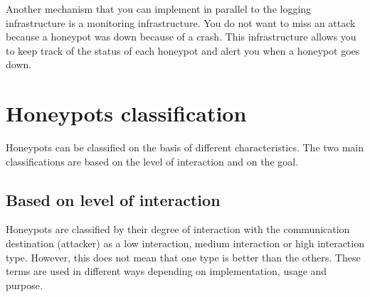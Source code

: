 \documentclass[epsfig,a4paper,11pt,titlepage,oneside,openany]{book}
\begin{document}
Another mechanism that you can implement in parallel to the logging infrastructure is a monitoring infrastructure. You do not want to miss an attack because a honeypot was down because of a crash. This infrastructure allows you to keep track of the status of each honeypot and alert you when a honeypot goes down.

\chapter{Honeypots classification}

Honeypots can be classified on the basis of different characteristics. The two main classifications are based on the level of interaction and on the goal.

\section{Based on level of interaction}

Honeypots are classified by their degree of interaction with the communication destination (attacker) as a low interaction, medium interaction or  high interaction type. However, this does not mean that one type is better than the others. These terms are used in different ways depending on implementation, usage and purpose.
\end{document}
